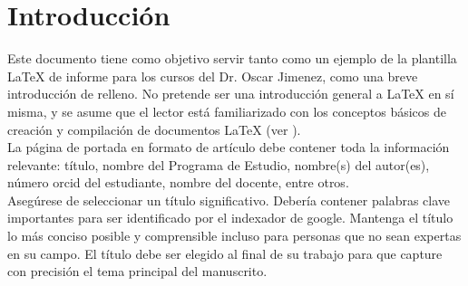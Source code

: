 \documentclass[11pt,a4paper]{article}
\begin{document}



\section{Introducción}
\label{sec:introduction}
Este documento tiene como objetivo servir tanto como un ejemplo de la plantilla \LaTeX{} de informe para los cursos del Dr. Oscar Jimenez, como una breve introducción de relleno. No pretende ser una introducción general a \LaTeX{} en sí misma, y se asume que el lector está familiarizado con los conceptos básicos de creación y compilación de documentos \LaTeX{} (ver \cite{oetiker1995not, kottwitz2015latex}). 
\\
La página de portada en formato de artículo debe contener toda la información relevante: título, nombre del Programa de Estudio, nombre(s) del autor(es), número orcid del estudiante, nombre del docente, entre otros.
\\
Asegúrese de seleccionar un título significativo. Debería contener palabras clave importantes para ser identificado por el indexador de google. Mantenga el título lo más conciso posible y comprensible incluso para personas que no sean expertas en su campo. El título debe ser elegido al final de su trabajo para que capture con precisión el tema principal del manuscrito.
\end{document}
